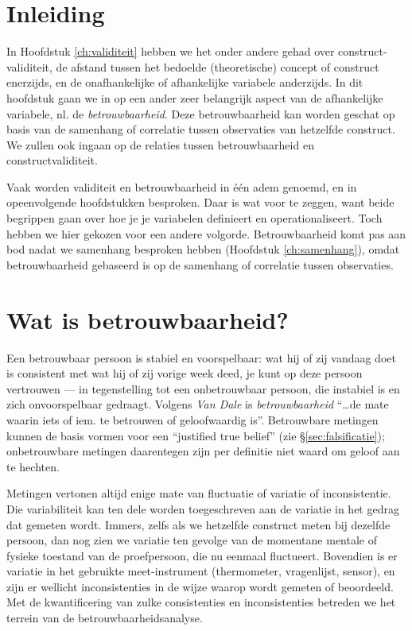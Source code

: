 \documentclass[
]{book}
\begin{document}
\hypertarget{inleiding-6}{%
\section{Inleiding}\label{inleiding-6}}

In Hoofdstuk \ref{ch:validiteit} hebben we het onder andere gehad over
construct-validiteit, de afstand tussen het bedoelde (theoretische)
concept of construct enerzijds, en de onafhankelijke of afhankelijke
variabele anderzijds. In dit hoofdstuk gaan we in op een ander zeer
belangrijk aspect van de afhankelijke variabele, nl. de
\emph{betrouwbaarheid}. Deze betrouwbaarheid kan worden geschat op basis van
de samenhang of correlatie tussen observaties van hetzelfde construct.
We zullen ook ingaan op de relaties tussen betrouwbaarheid en
constructvaliditeit.

Vaak worden validiteit en betrouwbaarheid in één adem genoemd, en in opeenvolgende hoofdstukken besproken. Daar is wat voor te zeggen, want beide begrippen gaan over hoe je je variabelen definieert en operationaliseert. Toch hebben we hier gekozen voor een andere volgorde. Betrouwbaarheid komt pas aan bod nadat we samenhang besproken hebben (Hoofdstuk \ref{ch:samenhang}), omdat betrouwbaarheid gebaseerd is op de samenhang of correlatie tussen observaties.

\hypertarget{wat-is-betrouwbaarheid}{%
\section{Wat is betrouwbaarheid?}\label{wat-is-betrouwbaarheid}}

Een betrouwbaar persoon is stabiel en voorspelbaar: wat hij of zij
vandaag doet is consistent met wat hij of zij vorige week deed, je kunt
op deze persoon vertrouwen --- in tegenstelling tot een onbetrouwbaar
persoon, die instabiel is en zich onvoorspelbaar gedraagt. Volgens \emph{Van
Dale} is \emph{betrouwbaarheid} ``\ldots de mate waarin iets of iem. te betrouwen
of geloofwaardig is''. Betrouwbare metingen kunnen de basis vormen voor
een ``justified true belief'' (zie
§\ref{sec:falsificatie}); onbetrouwbare metingen daarentegen zijn
per definitie niet waard om geloof aan te hechten.

Metingen vertonen altijd enige mate van fluctuatie of variatie of
inconsistentie. Die variabiliteit kan ten dele worden toegeschreven aan
de variatie in het gedrag dat gemeten wordt. Immers, zelfs als we
hetzelfde construct meten bij dezelfde persoon, dan nog zien we variatie
ten gevolge van de momentane mentale of fysieke toestand van de
proefpersoon, die nu eenmaal fluctueert. Bovendien is er variatie in het
gebruikte meet-instrument (thermometer, vragenlijst, sensor), en zijn er
wellicht inconsistenties in de wijze waarop wordt gemeten of beoordeeld.
Met de kwantificering van zulke consistenties en inconsistenties
betreden we het terrein van de betrouwbaarheidsanalyse.
\end{document}
